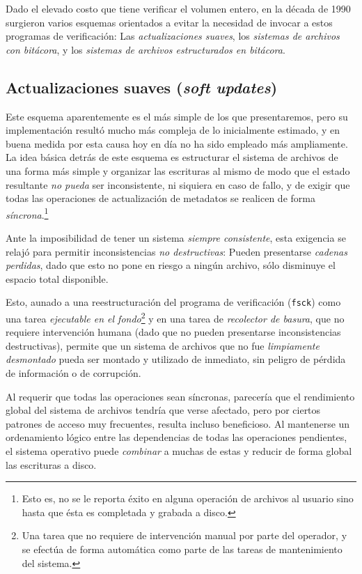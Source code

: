 \documentclass[11pt,fleqn]{book} %
\begin{document}
Dado el elevado costo que tiene verificar el volumen entero, en la
década de 1990 surgieron varios esquemas orientados a evitar la
necesidad de invocar a estos programas de verificación: Las
\emph{actualizaciones suaves}, los \emph{sistemas de archivos con bitácora}, y
los \emph{sistemas de archivos estructurados en bitácora}.
\subsection{Actualizaciones suaves (\emph{soft updates})}
\label{sec-7-3-3}


Este esquema aparentemente es el más simple de los que presentaremos,
pero su implementación resultó mucho más compleja de lo inicialmente
estimado, y en buena medida por esta causa hoy en día no ha sido
empleado más ampliamente. La idea básica detrás de este esquema es
estructurar el sistema de archivos de una forma más simple y organizar
las escrituras al mismo de modo que el estado resultante \emph{no pueda}
ser inconsistente, ni siquiera en caso de fallo, y de exigir que todas
las operaciones de actualización de metadatos se realicen de forma
\emph{síncrona}.\footnote{Esto es, no se le reporta éxito en alguna operación
de archivos al usuario sino hasta que ésta es completada y grabada a
disco. }

Ante la imposibilidad de tener un sistema \emph{siempre consistente}, esta
exigencia se relajó para permitir inconsistencias \emph{no destructivas}:
Pueden presentarse \emph{cadenas perdidas}, dado que esto no pone en
riesgo a ningún archivo, sólo disminuye el espacio total disponible.

Esto, aunado a una reestructuración del programa de verificación
(\texttt{fsck}) como una tarea \emph{ejecutable en el fondo}\footnote{Una tarea que no
requiere de intervención manual por parte del operador, y se efectúa
de forma automática como parte de las tareas de mantenimiento del
sistema. } y en una tarea de \emph{recolector de basura}, que no requiere intervención humana (dado que
no pueden presentarse inconsistencias destructivas), permite que un
sistema de archivos que no fue \emph{limpiamente desmontado} pueda ser
montado y utilizado de inmediato, sin peligro de pérdida de
información o de corrupción.

Al requerir que todas las operaciones sean síncronas, parecería que
el rendimiento global del sistema de archivos tendría que verse
afectado, pero por ciertos patrones de acceso muy frecuentes, resulta
incluso beneficioso. Al mantenerse un ordenamiento lógico entre las
dependencias de todas las operaciones pendientes, el
sistema operativo puede \emph{combinar} a muchas de estas y reducir de
forma global las escrituras a disco.
\end{document}
